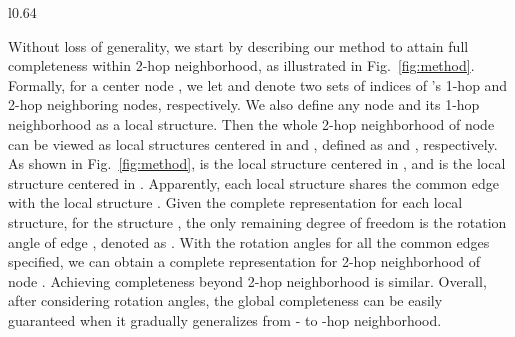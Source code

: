 \documentclass{article}
\begin{document}
\begin{wrapfigure}[14]{l}{0.64\textwidth}\vspace{-20 pt}
     \centering
     \quad
     \vspace{-6 pt}
    \caption{Illustrations of how to achieve global completeness in our proposed methods.}
    \label{fig:method}
    \vspace{-10 pt}
\end{wrapfigure}

Without loss of generality, we start by describing our method
to attain full completeness within 2-hop neighborhood, as illustrated in Fig.~\ref{fig:method}.
Formally, for a center node , we let  and  denote two sets of indices of 's 1-hop
and 2-hop neighboring nodes, respectively.
We also define any node  and its 1-hop neighborhood as a local structure.
Then the whole 2-hop neighborhood of node 
can be viewed as  local structures centered in  and , defined as 
 and , respectively. 
\textcolor{COLOR}{As shown in Fig.~\ref{fig:method},  is the local structure centered in , and  is the local structure centered in .}
Apparently, each local structure  shares the common edge  with the local structure .
Given the complete representation for each local structure, for the structure , the only remaining degree of freedom is the rotation angle of edge , denoted as .
With the rotation angles for all the  common edges specified, we can obtain a complete representation for 2-hop neighborhood of node . 
Achieving completeness beyond 2-hop neighborhood is similar.
Overall, after considering rotation angles, the global completeness can be easily guaranteed when it gradually generalizes from - to -hop neighborhood.
\end{document}
